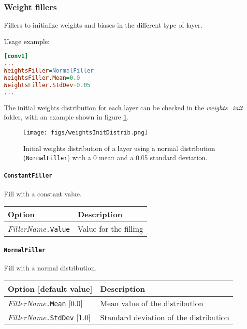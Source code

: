 \documentclass[a4paper,11pt,oneside]{article}
\begin{document}
\subsubsection{Weight fillers}
Fillers to initialize weights and biases in the different type of layer.

Usage example:
\begin{lstlisting}[language=ini]
[conv1]
...
WeightsFiller=NormalFiller
WeightsFiller.Mean=0.0
WeightsFiller.StdDev=0.05
...
\end{lstlisting}

The initial weights distribution for each layer can be checked in the
 \emph{weights\_init} folder, with an example shown in figure
 \ref{fig:weightsInitDistrib}.

\begin{figure}[!htb]
  \centering
  \texttt{[image: figs/weightsInitDistrib.png]}
  \caption{Initial weights distribution of a layer using a normal distribution
  (\lstinline!NormalFiller!) with a 0 mean and a 0.05 standard deviation.}
  \label{fig:weightsInitDistrib}
\end{figure}


\paragraph{\texorpdfstring{%
\lstinline[basicstyle=\ttfamily\bfseries]!ConstantFiller!}{ConstantFiller}}
Fill with a constant value.

\begin{center}
 \begin{tabular}{| p{5cm} | p{10cm} | }
 \hline
 Option & Description\\
 \hline\hline
  \cellcolor{requiredcolor}\emph{FillerName}\lstinline!.Value! & Value for the
  filling \\
 \hline
\end{tabular}
\end{center}

\paragraph{\texorpdfstring{%
\lstinline[basicstyle=\ttfamily\bfseries]!NormalFiller!}{NormalFiller}}
Fill with a normal distribution.

\begin{center}
 \begin{tabular}{| p{5cm} | p{10cm} | }
 \hline
 Option [default value] & Description\\
 \hline\hline
    \emph{FillerName}\lstinline!.Mean! [0.0] & Mean value of the distribution \\
    \emph{FillerName}\lstinline!.StdDev! [1.0] & Standard deviation of the
    distribution \\
 \hline
\end{tabular}
\end{center}
\end{document}
